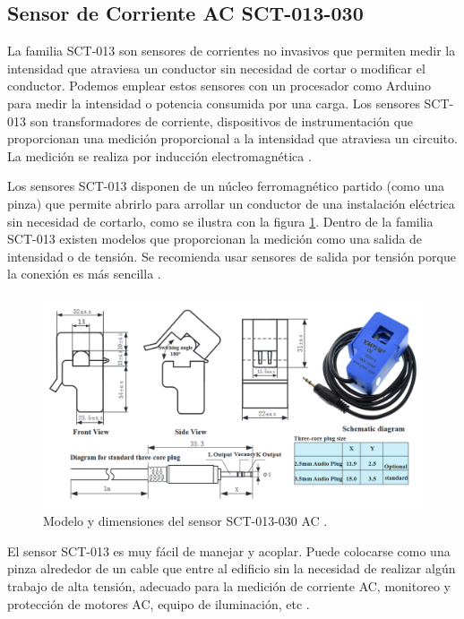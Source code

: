 \subsection{Sensor de Corriente AC SCT-013-030}

La familia SCT-013 son sensores de corrientes no invasivos que permiten medir la intensidad que atraviesa un conductor sin necesidad de cortar o modificar el conductor. Podemos emplear estos sensores con un procesador como Arduino para medir la intensidad o potencia consumida por una carga. Los sensores SCT-013 son transformadores de corriente, dispositivos de instrumentación que proporcionan una medición proporcional a la intensidad que atraviesa un circuito. La medición se realiza por inducción electromagnética \citep{WEBSITE:9}. 

Los sensores SCT-013 disponen de un núcleo ferromagnético partido (como una pinza) que permite abrirlo para arrollar un conductor de una instalación eléctrica sin necesidad de cortarlo, como se ilustra con la figura \ref{fig:sensorCorriente}. Dentro de la familia SCT-013 existen modelos que proporcionan la medición como una salida de intensidad o de tensión. Se recomienda usar sensores de salida por tensión porque la conexión es más sencilla \citep{WEBSITE:9}. 

\begin{figure}[htbp]
	\centering
	\includegraphics[width=1.0\textwidth]{./Figures/sensorCorriente2.png}
	\caption{Modelo y dimensiones del sensor SCT-013-030 AC \protect\footnotemark.}

	\label{fig:sensorCorriente}
\end{figure}


El sensor SCT-013 es muy fácil de manejar y acoplar. Puede colocarse como una pinza alrededor de un cable que entre al edificio sin la necesidad de realizar algún trabajo de alta tensión, adecuado para la medición de corriente AC, monitoreo y protección de motores AC, equipo de iluminación, etc \citep{WEBSITE:10}.

